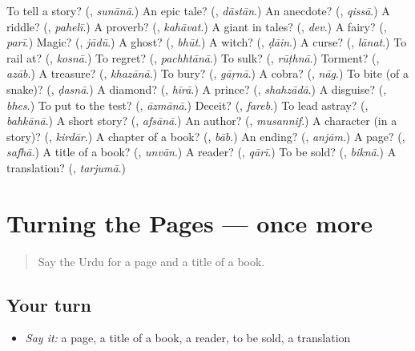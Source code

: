 \begin{tcolorbox}[breakable,colback=teal!4,colframe=teal!35!black,title={Before you move on}]
To tell a story? (\textbf{}, \emph{sunānā}.) An epic tale? (\textbf{}, \emph{dāstān}.) An anecdote? (\textbf{}, \emph{qissā}.) A riddle? (\textbf{}, \emph{pahelī}.) A proverb? (\textbf{}, \emph{kahāvat}.) A giant in tales? (\textbf{}, \emph{dev}.) A fairy? (\textbf{}, \emph{parī}.) Magic? (\textbf{}, \emph{jādū}.) A ghost? (\textbf{}, \emph{bhūt}.) A witch? (\textbf{}, \emph{ḍāin}.) A curse? (\textbf{}, \emph{lānat}.) To rail at? (\textbf{}, \emph{kosnā}.) To regret? (\textbf{}, \emph{pachhtānā}.) To sulk? (\textbf{}, \emph{rūṭhnā}.) Torment? (\textbf{}, \emph{azāb}.) A treasure? (\textbf{}, \emph{khazānā}.) To bury? (\textbf{}, \emph{gāṛnā}.) A cobra? (\textbf{}, \emph{nāg}.) To bite (of a snake)? (\textbf{}, \emph{ḍasnā}.) A diamond? (\textbf{}, \emph{hīrā}.) A prince? (\textbf{}, \emph{shahzādā}.) A disguise? (\textbf{}, \emph{bhes}.) To put to the test? (\textbf{}, \emph{āzmānā}.) Deceit? (\textbf{}, \emph{fareb}.) To lead astray? (\textbf{}, \emph{bahkānā}.) A short story? (\textbf{}, \emph{afsānā}.) An author? (\textbf{}, \emph{musannif}.) A character (in a story)? (\textbf{}, \emph{kirdār}.) A chapter of a book? (\textbf{}, \emph{bāb}.) An ending? (\textbf{}, \emph{anjām}.) A page? (\textbf{}, \emph{safhā}.) A title of a book? (\textbf{}, \emph{unvān}.) A reader? (\textbf{}, \emph{qārī}.) To be sold? (\textbf{}, \emph{biknā}.) A translation? (\textbf{}, \emph{tarjumā}.)
\end{tcolorbox}
\section[(dialogue)]{Turning the Pages — once more}

\label{lesson:UR-R330-review-final-330}



\begin{quote}
Say the Urdu for a page and a title of a book.
\end{quote}

\subsection*{Your turn}
\begin{itemize}
\raggedright
  \item \emph{Say it:} a page, a title of a book, a reader, to be sold, a translation
\end{itemize}

